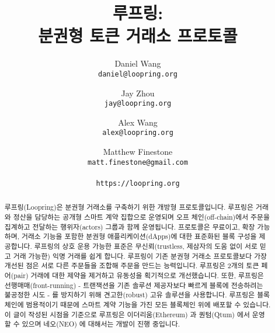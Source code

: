 \documentclass[UTF8,nofonts]{article}
\title{\textbf{루프링:}\\\textbf{분권형 토큰 거래소 프로토콜}}
\author{
  Daniel Wang\\
  \texttt{daniel@loopring.org}\\
  \and
  	Jay Zhou\\
  	\texttt{jay@loopring.org}\\
  	\and
  	Alex Wang\\
  	\texttt{alex@loopring.org}\\
  	\and
  	Matthew Finestone\\
  	\texttt{matt.finestone@gmail.com}\\ 
  \\
  \texttt{https://loopring.org}
 }
\begin{document}
\maketitle


\begin{abstract}
루프링(Loopring)은 분권형 거래소를 구축하기 위한 개방형 프로토콜입니다. 루프링은 거래와 정산을 담당하는 공개형 스마트 계약 집합으로 운영되며 오프 체인(off-chain)에서 주문을 집계하고 전달하는 행위자(actors) 그룹과 함께 운영됩니다. 프로토콜은 무료이고, 확장 가능하며, 거래소 기능을 포함한 분권형 애플리케이션(dApps)에 대한 표준화된 블록 구성을 제공합니다. 루프링의 상호 운용 가능한 표준은 무신뢰(trustless, 제삼자의 도움 없이 서로 믿고 거래 가능한) 익명 거래를 쉽게 합니다. 루프링이 기존 분권형 거래소 프로토콜보다 가장 개선된 점은 서로 다른 주문들을 조합해 주문을 만드는 능력입니다. 루프링은 2개의 토큰 페어(pair) 거래에 대한 제약을 제거하고 유동성을 획기적으로 개선했습니다. 또한, 루프링은 선행매매(front-running) - 트랜잭션을 기존 솔루션 제공자보다 빠르게 블록에 전송하려는 불공정한 시도 - 를 방지하기 위해 견고한(robust) 고유 솔루션을 사용합니다. 루프링은 블록체인에 범용적이기 때문에 스마트 계약 기능을 가진 모든 블록체인 위에 배포할 수 있습니다. 이 글이 작성된 시점을 기준으로 루프링은 이더리움(Ethereum) \cite{buterin2017ethereum} \cite{wood2014ethereum} 과 퀀텀(Qtum) \cite{dai2017smart}에서 운영할 수 있으며 네오(NEO) \cite{atterlonn2018distributed}에 대해서는 개발이 진행 중입니다. 
\end{abstract}
\end{document}
